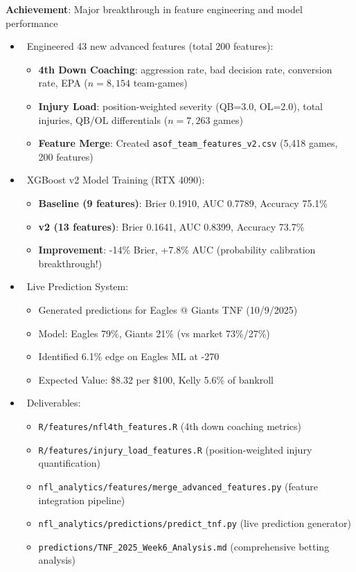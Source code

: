\textbf{Achievement}: Major breakthrough in feature engineering and model performance
\begin{itemize}
  \item \done\ Engineered 43 new advanced features (total 200 features):
  \begin{itemize}
    \item \textbf{4th Down Coaching}: aggression rate, bad decision rate, conversion rate, EPA ($n=8,154$ team-games)
    \item \textbf{Injury Load}: position-weighted severity (QB=3.0, OL=2.0), total injuries, QB/OL differentials ($n=7,263$ games)
    \item \textbf{Feature Merge}: Created \texttt{asof\_team\_features\_v2.csv} (5,418 games, 200 features)
  \end{itemize}
  \item \done\ XGBoost v2 Model Training (RTX 4090):
  \begin{itemize}
    \item \textbf{Baseline (9 features)}: Brier 0.1910, AUC 0.7789, Accuracy 75.1\%
    \item \textbf{v2 (13 features)}: Brier 0.1641, AUC 0.8399, Accuracy 73.7\%
    \item \textbf{Improvement}: -14\% Brier, +7.8\% AUC (probability calibration breakthrough!)
  \end{itemize}
  \item \done\ Live Prediction System:
  \begin{itemize}
    \item Generated predictions for Eagles @ Giants TNF (10/9/2025)
    \item Model: Eagles 79\%, Giants 21\% (vs market 73\%/27\%)
    \item Identified 6.1\% edge on Eagles ML at -270
    \item Expected Value: \$8.32 per \$100, Kelly 5.6\% of bankroll
  \end{itemize}
  \item \done\ Deliverables:
  \begin{itemize}
    \item \texttt{R/features/nfl4th\_features.R} (4th down coaching metrics)
    \item \texttt{R/features/injury\_load\_features.R} (position-weighted injury quantification)
    \item \texttt{nfl\_analytics/features/merge\_advanced\_features.py} (feature integration pipeline)
    \item \texttt{nfl\_analytics/predictions/predict\_tnf.py} (live prediction generator)
    \item \texttt{predictions/TNF\_2025\_Week6\_Analysis.md} (comprehensive betting analysis)
  \end{itemize}
\end{itemize}

